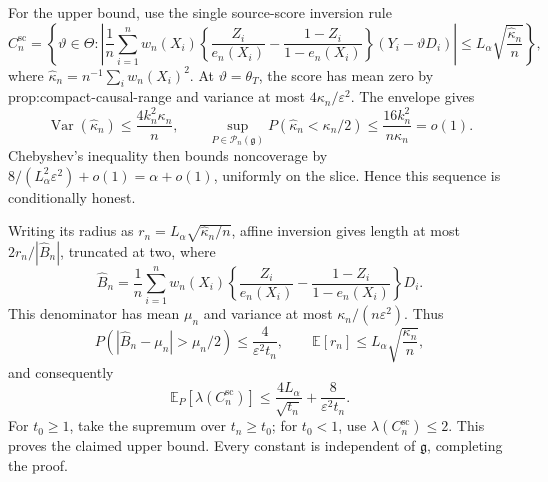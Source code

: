 For the upper bound, use the single source-score inversion rule
\[
 C_n^{\mathrm{sc}}=\left\{\vartheta\in\Theta:
 \left|\frac1n\sum_{i=1}^nw_n(X_i)
 \left\{\frac{Z_i}{e_n(X_i)}-\frac{1-Z_i}{1-e_n(X_i)}\right\}
 (Y_i-\vartheta D_i)\right|
 \le L_\alpha\sqrt{\frac{\widehat\kappa_n}{n}}\right\},
\]
where \(\widehat\kappa_n=n^{-1}\sum_iw_n(X_i)^2\).  At \(\vartheta=\theta_T\), the score has mean zero by prop:compact-causal-range and variance at most \(4\kappa_n/\varepsilon^2\).  The envelope gives
\[
 \operatorname{Var}(\widehat\kappa_n)
 \le\frac{4k_n^2\kappa_n}{n},
 \qquad
 \sup_{P\in\mathcal P_n(\mathfrak g)}
 P(\widehat\kappa_n<\kappa_n/2)
 \le\frac{16k_n^2}{n\kappa_n}=o(1).
\]
Chebyshev's inequality then bounds noncoverage by \(8/(L_\alpha^2\varepsilon^2)+o(1)=\alpha+o(1)\), uniformly on the slice.  Hence this sequence is conditionally honest.

Writing its radius as \(r_n=L_\alpha\sqrt{\widehat\kappa_n/n}\), affine inversion gives length at most \(2r_n/|\widehat B_n|\), truncated at two, where
\[
 \widehat B_n=\frac1n\sum_{i=1}^nw_n(X_i)
 \left\{\frac{Z_i}{e_n(X_i)}-\frac{1-Z_i}{1-e_n(X_i)}\right\}D_i.
\]
This denominator has mean \(\mu_n\) and variance at most \(\kappa_n/(n\varepsilon^2)\).  Thus
\[
 P(|\widehat B_n-\mu_n|>\mu_n/2)
 \le\frac{4}{\varepsilon^2t_n},
 \qquad
 \mathbb E[r_n]\le L_\alpha\sqrt{\frac{\kappa_n}{n}},
\]
and consequently
\[
 \mathbb E_P[\lambda(C_n^{\mathrm{sc}})]
 \le\frac{4L_\alpha}{\sqrt{t_n}}+
 \frac{8}{\varepsilon^2t_n}.
\]
For \(t_0\ge1\), take the supremum over \(t_n\ge t_0\); for \(t_0<1\), use \(\lambda(C_n^{\mathrm{sc}})\le2\).  This proves the claimed upper bound.  Every constant is independent of \(\mathfrak g\), completing the proof.